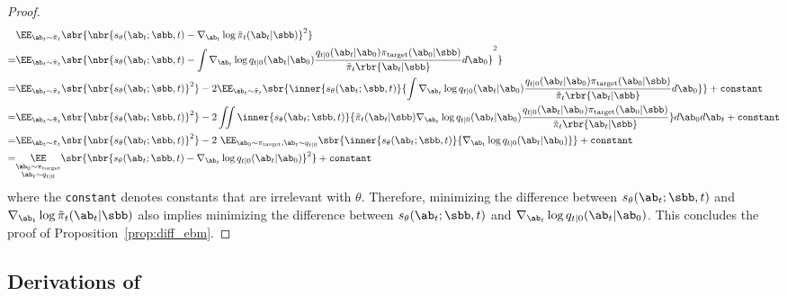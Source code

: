 \begin{proof}
    {\small
    \begin{align}
       &\EE_{\ab_t\sim\tilde\pi_t}\sbr{\nbr{s_\theta(\ab_t;\sbb, t) - \nabla_{\ab_t}\log \tilde\pi_t(\ab_t|\sbb)}^2}\notag \\
       =&\EE_{\ab_t\sim\tilde\pi_t}\sbr{\nbr{s_\theta(\ab_t;\sbb, t) - \int\nabla_{\ab_t}\log q_{t|0}(\ab_t|\ab_0)\frac{q_{t|0}(\ab_t|\ab_0)\pi_{\rm target}(\ab_0|\sbb)}{\tilde\pi_t\rbr{\ab_t|\sbb}}d\ab_0}^2}\notag\\ 
       = & \EE_{\ab_t\sim\tilde\pi_t}\sbr{\nbr{s_\theta(\ab_t;\sbb, t)}^2} - 2\EE_{\ab_t\sim\tilde\pi_t}\sbr{\inner{s_\theta(\ab_t;\sbb, t)}{\int\nabla_{\ab_t}\log q_{t|0}(\ab_t|\ab_0)\frac{q_{t|0}(\ab_t|\ab_0)\pi_{\rm target}(\ab_0|\sbb)}{\tilde\pi_t\rbr{\ab_t|\sbb}}d\ab_0}} + \texttt{constant}\\
       = & \EE_{\ab_t\sim\tilde\pi_t}\sbr{\nbr{s_\theta(\ab_t;\sbb, t)}^2} - 2\iint{\inner{s_\theta(\ab_t;\sbb, t)}{\tilde\pi_t(\ab_t|\sbb)\nabla_{\ab_t}\log q_{t|0}(\ab_t|\ab_0)\frac{q_{t|0}(\ab_t|\ab_0)\pi_{\rm target}(\ab_0|\sbb)}{\tilde\pi_t\rbr{\ab_t|\sbb}}}}d\ab_0 d\ab_t + \texttt{constant}\\
        = & \EE_{\ab_t\sim\tilde\pi_t}\sbr{\nbr{s_\theta(\ab_t;\sbb, t)}^2} - 2~\EE_{\ab_0\sim\pi_{\rm target}, \ab_t\sim q_{t|0}}\sbr{\inner{s_\theta(\ab_t;\sbb, t)}{\nabla_{\ab_t}\log q_{t|0}(\ab_t|\ab_0)}} + \texttt{constant}\\
       =&\underset{\substack{\ab_0\sim\pi_{\rm target}\\\ab_t\sim q_{t|0}}}{\EE}\sbr{\nbr{s_\theta(\ab_t;\sbb, t) -\nabla_{\ab_t}\log q_{t|0}(\ab_t|\ab_0)}^2} + \texttt{constant}\label{eq:tweedie_loss_apdx}
    \end{align}
    }
    where the \texttt{constant} denotes constants that are irrelevant with $\theta$. Therefore, minimizing the difference between $s_\theta(\ab_t;\sbb, t)$ and $\nabla_{\ab_t}\log \tilde\pi_t(\ab_t|\sbb)$ also implies minimizing the difference between $s_\theta(\ab_t;\sbb, t)$ and $\nabla_{\ab_t}\log q_{t|0}(\ab_t|\ab_0)$.
    This concludes the proof of Proposition~\ref{prop:diff_ebm}.
\end{proof}
\subsection{Derivations of }
\label{sec:appendix_derivation}

